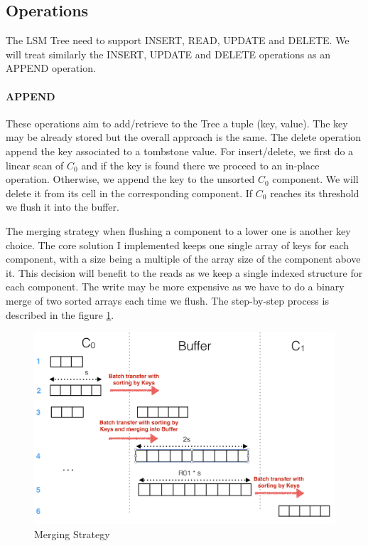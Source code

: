 \documentclass{sig-alternate-05-2015}
\begin{document}
\subsection{Operations}
The LSM Tree need to support INSERT, READ, UPDATE and DELETE. We will treat similarly the INSERT, UPDATE and DELETE operations as an APPEND operation.

\paragraph{APPEND}
These operations aim to add/retrieve to the Tree a tuple (key, value). The key may be already stored but the overall approach is the same. The delete operation append the key associated to a tombstone value. For insert/delete, we first do a linear scan of $C_0$ and if the key is found there we proceed to an in-place operation. Otherwise, we append the key to the unsorted $C_0$ component. We will delete it from its cell in the corresponding component. If $C_0$ reaches its threshold we flush it into the buffer.

The merging strategy when flushing a component to a lower one is another key choice. The core solution I implemented keeps one single array of keys for each component, with a size being a multiple of the array size of the component above it. This decision will benefit to the reads as we keep a single indexed structure for each component. The write may be more expensive as we have to do a binary merge of two sorted arrays each time we flush. The step-by-step process is described in the figure \ref{fig:merge}.

\begin{figure}[H]%
\begin{center}
    \includegraphics[width=\columnwidth]{img/merge}%
    \caption{Merging Strategy}
    \label{fig:merge}
\end{center}
\end{figure}%
\end{document}
